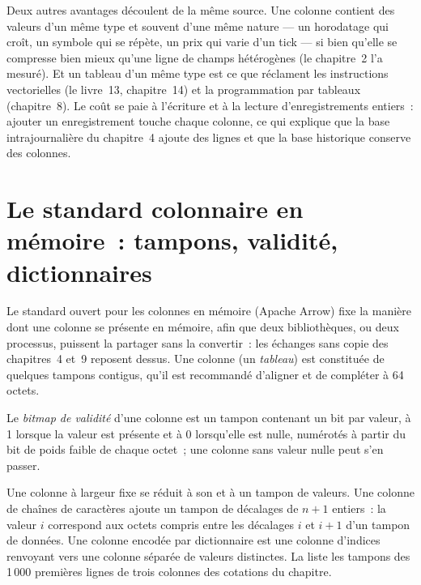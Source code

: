 Deux autres avantages découlent de la même source. Une colonne contient des valeurs d'un même type et souvent d'une même nature --- un horodatage qui
croît, un symbole qui se répète, un prix qui varie d'un tick --- si bien qu'elle se compresse bien mieux qu'une ligne de champs hétérogènes
(le chapitre~2 l'a mesuré). Et un tableau d'un même type est ce que réclament les instructions vectorielles (le livre~13, chapitre~14) et la programmation par
tableaux (chapitre~8). Le coût se paie à l'écriture et à la lecture d'enregistrements entiers~: ajouter un enregistrement touche chaque
colonne, ce qui explique que la base intrajournalière du chapitre~4 ajoute des lignes et que la base historique conserve des colonnes.

\section{Le standard colonnaire en mémoire~: tampons, validité, dictionnaires}

Le standard ouvert pour les colonnes en mémoire (Apache Arrow) fixe la manière dont une colonne se présente en mémoire, afin que deux bibliothèques, ou deux
processus, puissent la partager sans la convertir~: les échanges sans copie des chapitres~4 et~9 reposent dessus. Une colonne (un
\emph{tableau}) est constituée de quelques tampons contigus, qu'il est recommandé d'aligner et de compléter à 64 octets.

\begin{definition}\label{def:pl:columnar-formats:validity}
Le \emph{bitmap de validité} d'une colonne est un tampon contenant un bit par valeur, à 1 lorsque la valeur est
présente et à 0 lorsqu'elle est nulle, numérotés à partir du bit de poids faible de chaque octet~; une colonne sans valeur nulle peut s'en passer.
\end{definition}

Une colonne à largeur fixe se réduit à son  et à un tampon de valeurs. Une colonne de chaînes de caractères ajoute un tampon de décalages de $n+1$ entiers~:
la valeur $i$ correspond aux octets compris entre les décalages $i$ et $i+1$ d'un tampon de données. Une colonne encodée par dictionnaire est une colonne
d'indices renvoyant vers une colonne séparée de valeurs distinctes. La  liste les tampons des
1\,000 premières lignes de trois colonnes des cotations du chapitre.

